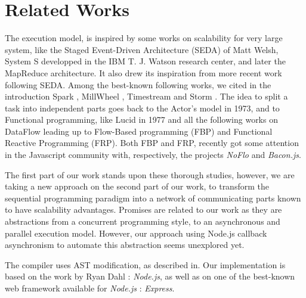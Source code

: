 \section{Related Works} \label{section:related}

The execution model, is inspired by some works on scalability for very large system, like the Staged Event-Driven Architecture (SEDA) of Matt Welsh\cite{Welsh2000}, System S developped in the IBM T. J. Watson research center\cite{Jain2006,Wu2007}, and later the MapReduce architecture\cite{Dean2008}.
It also drew its inspiration from more recent work following SEDA.
Among the best-known following works, we cited in the introduction Spark \cite{Zaharia2010, Zaharia2012}, MillWheel \cite{Akidau2013}, Timestream \cite{Qian2013} and Storm \cite{Marz2011}.
The idea to split a task into independent parts goes back to the Actor's model\cite{Hewitt1973} in 1973, and to Functional programming, like Lucid\cite{Ashcroft1977} in 1977 and all the following works on DataFlow leading up to Flow-Based programming (FBP)\cite{Morrison1994a} and Functional Reactive Programming (FRP)\cite{Elliott1997}.
Both FBP and FRP, recently got some attention in the Javascript community with, respectively, the projects \textit{NoFlo}\cite{NoFlo} and \textit{Bacon.js}\cite{Paananen2012}.

The first part of our work stands upon these thorough studies, however, we are taking a new approach on the second part of our work, to transform the sequential programming paradigm into a network of communicating parts known to have scalability advantages.
Promises\cite{Liskov1988} are related to our work as they are abstractions from a concurrent programming style, to an asynchronous and parallel execution model.
However, our approach using Node.js callback asynchronism to automate this abstraction seems unexplored yet.

The compiler uses AST modification, as described in\cite{Jones2003}.
Our implementation is based on the work by Ryan Dahl : \textit{Node.js}\cite{Dahl}, as well as on one of the best-known web framework available for \textit{Node.js} : \textit{Express}\cite{express}.


\\
